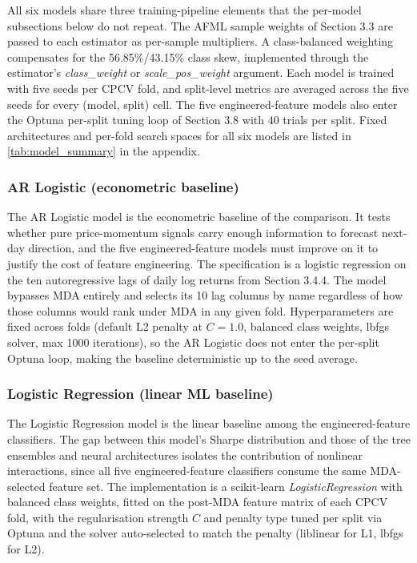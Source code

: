 \documentclass[12pt,a4paper,oneside]{article}
\begin{document}
All six models share three training-pipeline elements that the per-model subsections below do not repeat. The AFML sample weights of Section 3.3 are passed to each estimator as per-sample multipliers. A class-balanced weighting compensates for the 56.85\%/43.15\% class skew, implemented through the estimator's \textit{class\_weight} or \textit{scale\_pos\_weight} argument. Each model is trained with five seeds per CPCV fold, and split-level metrics are averaged across the five seeds for every (model, split) cell. The five engineered-feature models also enter the Optuna per-split tuning loop of Section 3.8 with 40 trials per split. Fixed architectures and per-fold search spaces for all six models are listed in \label{ref:model_summary_call}\autoref{tab:model_summary} in the appendix.


\subsubsection{AR Logistic (econometric baseline)}\label{subsubsec:ar}

The AR Logistic model is the econometric baseline of the comparison. It tests whether pure price-momentum signals carry enough information to forecast next-day direction, and the five engineered-feature models must improve on it to justify the cost of feature engineering. The specification is a logistic regression on the ten autoregressive lags of daily log returns from Section 3.4.4. The model bypasses MDA entirely and selects its 10 lag columns by name regardless of how those columns would rank under MDA in any given fold. Hyperparameters are fixed across folds (default L2 penalty at $C = 1.0$, balanced class weights, lbfgs solver, max 1000 iterations), so the AR Logistic does not enter the per-split Optuna loop, making the baseline deterministic up to the seed average.


\subsubsection{Logistic Regression (linear ML baseline)}\label{subsubsec:lr}

The Logistic Regression model is the linear baseline among the engineered-feature classifiers. The gap between this model's Sharpe distribution and those of the tree ensembles and neural architectures isolates the contribution of nonlinear interactions, since all five engineered-feature classifiers consume the same MDA-selected feature set. The implementation is a scikit-learn \textit{LogisticRegression} with balanced class weights, fitted on the post-MDA feature matrix of each CPCV fold, with the regularisation strength $C$ and penalty type tuned per split via Optuna and the solver auto-selected to match the penalty (liblinear for L1, lbfgs for L2).
\end{document}
